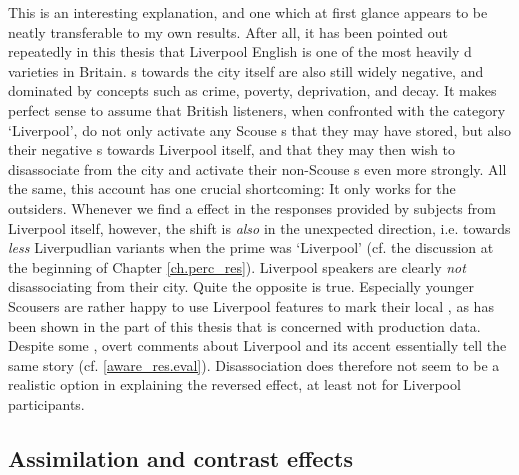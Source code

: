 This is an interesting explanation, and one which at first glance appears to be neatly transferable to my own results.
After all, it has been pointed out repeatedly in this thesis that Liverpool English is one of the most heavily d varieties in Britain.
s towards the city itself are also still widely negative, and dominated by concepts such as crime, poverty, deprivation, and decay.
It makes perfect sense to assume that British listeners, when confronted with the category `Liverpool', do not only activate any Scouse s that they may have stored, but also their negative s towards Liverpool itself, and that they may then wish to disassociate from the city and activate their non-Scouse s even more strongly.
All the same, this account has one crucial shortcoming: It only works for the outsiders.
Whenever we find a  effect in the responses provided by subjects from Liverpool itself, however, the shift is \emph{also} in the unexpected direction, i.e. towards \emph{less} Liverpudlian variants when the prime was `Liverpool' (cf. the discussion at the beginning of Chapter \ref{ch.perc_res}).
Liverpool speakers are clearly \emph{not} disassociating from their city.
Quite the opposite is true.
Especially younger Scousers are rather happy to use Liverpool features to mark their local , as has been shown in the part of this thesis that is concerned with production data.
Despite some , overt comments about Liverpool and its accent essentially tell the same story (cf. \ref{aware_res.eval}).
Disassociation does therefore not seem to be a realistic option in explaining the reversed  effect, at least not for Liverpool participants.

		\subsection{Assimilation and contrast effects}

